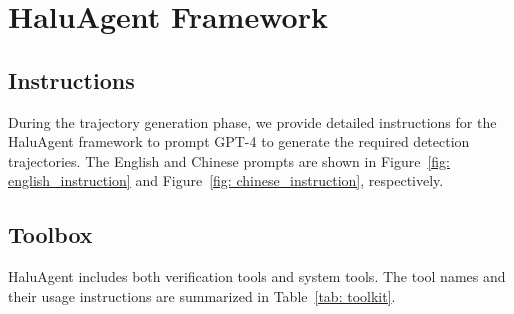 
\section{HaluAgent Framework}
\label{app: instructions}
\subsection{Instructions}

During the trajectory generation phase, we provide detailed instructions for the HaluAgent framework to prompt GPT-4 to generate the required detection trajectories. The English and Chinese prompts are shown in Figure~\ref{fig: english_instruction} and Figure~\ref{fig: chinese_instruction}, respectively.

\subsection{Toolbox}
\label{app: toolkit}

HaluAgent includes both verification tools and system tools. The tool names and their usage instructions are summarized in Table~\ref{tab: toolkit}.

